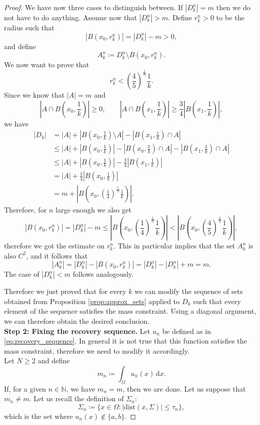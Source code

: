 \documentclass[a4paper, 11pt, reqno]{amsart}
\theoremstyle{plain}
\theoremstyle{definition}
\theoremstyle{remark}
\newcommand{\N}{\mathbb N}
\newcommand{\dd}{\,\mathrm{d}}
\begin{document}
\begin{proof}
We have now three cases to distinguish between. If $| D_k^n | = m$ then we do not have to do anything. Assume now that $ | D_k^n | > m $. Define $r_k^n >0$ to be the radius such that
$$ \left| B \left( x_0, r_k^n \right) \right| = \left| D_k^n \right| - m > 0, $$
and define
$$ A_k^n \coloneqq D_k^n \setminus B \left( x_0, r_k^n \right). $$
We now want to prove that $$ r_k^n < \left( \frac{4}{5} \right)^\frac{1}{N} \frac{1}{k}. $$
Since we know that $|A|=m$ and
$$ \left| A \cap B \left( x_0, \frac{1}{k} \right) \right| \geq 0, \qquad \left| A \cap B \left( x_1, \frac{1}{k} \right) \right| \geq \frac{3}{4} \left| B \left( x_1, \frac{1}{k} \right) \right|, $$
we have
\begin{align*}
	\left| D_k \right| &= |A| + \left| B \left( x_0, \frac{1}{k} \right) \setminus A \right| - \left| B \left( x_1, \frac{1}{k} \right) \cap A \right| \\
	&\leq |A| + \left| B \left( x_0, \frac{1}{k} \right) \right| - \left| B \left( x_0, \frac{1}{k} \right) \cap A \right| - \left| B \left( x_1, \frac{1}{k} \right) \cap A \right| \\
	&\leq |A| + \left| B \left( x_0, \frac{1}{k} \right) \right| - \frac{3}{4} \left| B \left( x_1, \frac{1}{k} \right) \right| \\
	&= |A| + \frac{1}{4} \left| B \left( x_0, \frac{1}{k} \right) \right| \\
	&= m + \left| B \left( x_0, \left( \frac{1}{4} \right)^\frac{1}{N} \frac{1}{k} \right) \right|.
\end{align*}
Therefore, for $n$ large enough we also get 
$$ \left| B \left( x_0, r_k^n \right) \right| = \left| D_k^n \right| - m \leq \left| B \left( x_0, \left( \frac{1}{4} \right)^\frac{1}{N} \frac{1}{k} \right) \right| < \left| B \left( x_0, \left( \frac{4}{5} \right)^\frac{1}{N} \frac{1}{k} \right) \right|, $$
therefore we got the estimate on $r_k^n$.
This in particular implies that the set $A_k^n$ is also $C^2$, and it follows that
$$ |A_k^n| = |D_k^n| - \left| B \left( x_0, r_k^n \right) \right| = |D_k^n| - |D_k^n| + m = m. $$
The case of $|D_k^n| < m$ follows analogously. 

Therefore we just proved that for every $k$ we can modify the sequence of sets obtained from Proposition \ref{prop:approx_sets} applied to $D_k$ such that every element of the sequence satisfies the mass constraint. Using a diagonal argument, we can therefore obtain the desired conclusion.\\[0.5em]
\textbf{Step 2: Fixing the recovery sequence.}
Let $u_n$ be defined as in \eqref{eq:recovery_sequence}. In general it is not true that this function satisfies the mass constraint, therefore we need to modify it accordingly.\\
Let $N \geq 2$ and define
$$ m_n \coloneqq \int_\Omega u_n (x) \dd x. $$
If, for a given $n \in \N$, we have $m_n = m$, then we are done. Let us suppose that $m_n \neq m$. 
Let us recall the definition of $\Sigma_n$:
$$ \Sigma_n \coloneqq \{ x \in \Omega : | \mathrm{dist}(x, \Sigma) | \leq \tau_n \}, $$
which is the set where $u_n(x) \notin \{a, b\}$. 


\end{proof}
\end{document}
